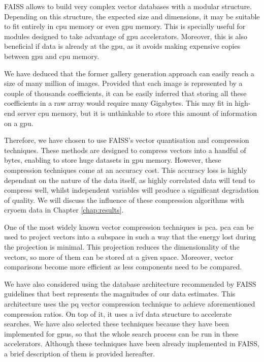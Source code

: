 \documentclass[../main.tex]{subfiles}
\begin{document}
FAISS allows to build very complex vector databases with a modular structure. Depending on this structure, the expected size and dimensions, it may be suitable to fit entirely in \gls{cpu} memory or even \gls{gpu} memory. This is specially useful for modules designed to take advantage of \gls{gpu} accelerators. Moreover, this is also beneficial if data is already at the \gls{gpu}, as it avoids making expensive copies between \gls{gpu} and \gls{cpu} memory.

We have deduced that the former gallery generation approach can easily reach a size of many million of images. Provided that each image is represented by a couple of thousands coefficients, it can be easily inferred that storing all these coefficients in a raw array would require many Gigabytes. This may fit in high-end server \gls{cpu} memory, but it is unthinkable to store this amount of information on a \gls{gpu}.

Therefore, we have chosen to use FAISS's vector quantisation and compression techniques. These methods are designed to compress vectors into a handful of bytes, enabling to store huge datasets in \gls{gpu} memory. However, these compression techniques come at an accuracy cost. This accuracy loss is highly dependant on the nature of the data itself, as highly correlated data will tend to compress well, whilst independent variables will produce a significant degradation of quality. We will discuss the influence of these compression algorithms with \gls{cryoem} data in Chapter \ref{chap:results}.

One of the most widely known vector compression techniques is \gls{pca}. \Gls{pca} can be used to project vectors into a subspace in such a way that the energy lost during the projection is minimal. This projection reduces the dimensionality of the vectors, so more of them can be stored at a given space. Moreover, vector comparisons become more efficient as less components need to be compared.

We have also considered using the database architecture recommended by FAISS guidelines\cite{johnson2019} that best represents the magnitudes of our data estimates. This architecture uses the \gls{pq} vector compression technique to achieve aforementioned compression ratios. On top of it, it uses a \gls{ivf} data structure to accelerate searches. We have also selected these techniques because they have been implemented for \glspl{gpu}, so that the whole search process can be run in these accelerators. Although these techniques have been already implemented in FAISS, a brief description of them is provided hereafter.
\end{document}
